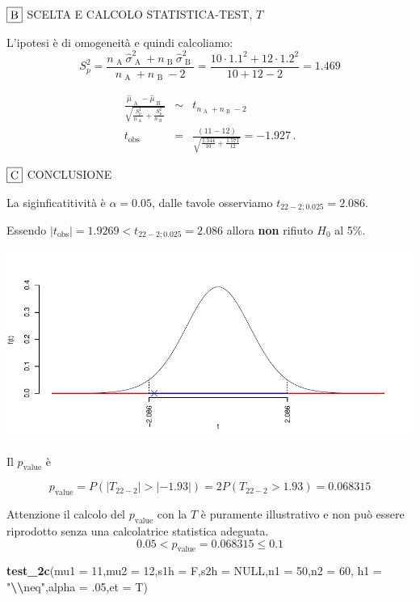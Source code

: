 \documentclass[
  11pt,
]{book}
\newenvironment{Shaded}{\begin{snugshade}}{\end{snugshade}}
\newcommand{\AttributeTok}[1]{\textcolor[rgb]{0.13,0.29,0.53}{#1}}
\newcommand{\ConstantTok}[1]{\textcolor[rgb]{0.56,0.35,0.01}{#1}}
\newcommand{\DecValTok}[1]{\textcolor[rgb]{0.00,0.00,0.81}{#1}}
\newcommand{\FunctionTok}[1]{\textcolor[rgb]{0.13,0.29,0.53}{\textbf{#1}}}
\newcommand{\NormalTok}[1]{#1}
\newcommand{\SpecialCharTok}[1]{\textcolor[rgb]{0.81,0.36,0.00}{\textbf{#1}}}
\newcommand{\StringTok}[1]{\textcolor[rgb]{0.31,0.60,0.02}{#1}}
\theoremstyle{mytheoremstyle}
\theoremstyle{mydefstyle}
\begin{document}
\(\fbox{B}\) SCELTA E CALCOLO STATISTICA-TEST, \(T\)

L'ipotesi è di omogeneità e quindi calcoliamo:\[
   S_p^2=\frac{n_\text{ A }\hat\sigma^2_\text{ A }+n_\text{ B }\hat\sigma^2_\text{ B }}{n_\text{ A }+n_\text{ B }-2} =
   \frac{ 10 \cdot 1.1 ^2+ 12 \cdot 1.2 ^2}{ 10 + 12 -2}= 1.469 
  \]

\begin{eqnarray*}
  \frac{\hat\mu_\text{ A } - \hat\mu_\text{ B }}
  {\sqrt{\frac {S^2_p}{n_\text{ A }}+\frac {S^2_p}{n_\text{ B }}}}&\sim&t_{n_\text{ A }+n_\text{ B }-2}\\
  t_{\text{obs}}
  &=& \frac{ ( 11 -  12 )} {\sqrt{\frac{ 1.344 }{ 10 }+\frac{ 1.571 }{ 12 }}}
  =   -1.927 \, .
  \end{eqnarray*}

\(\fbox{C}\) CONCLUSIONE

La siginficatitività è \(\alpha=0.05\), dalle tavole osserviamo \(t_{22-2;0.025}=2.086\).

Essendo \(|t_\text{obs}|=1.9269<t_{22-2;0.025}=2.086\) allora \textbf{non} rifiuto \(H_0\) al 5\%.

\begin{center}\includegraphics{Appunti_di_Statistica_2025_files/figure-latex/25-test-functions-10-9} \end{center}

Il \(p_{\text{value}}\) è

\[ p_{\text{value}} = P(|T_{22-2}|>|-1.93|)=2P(T_{22-2}>1.93)=0.068315 \]

Attenzione il calcolo del \(p_\text{value}\) con la \(T\) è puramente illustrativo e non può essere riprodotto senza una calcolatrice statistica adeguata.\[
 0.05 < p_\text{value}= 0.068315 \leq 0.1 
\]

\begin{Shaded}
\begin{Highlighting}[]
\FunctionTok{test\_2c}\NormalTok{(}\AttributeTok{mu1 =} \DecValTok{11}\NormalTok{,}\AttributeTok{mu2 =} \DecValTok{12}\NormalTok{,}\AttributeTok{s1h =}\NormalTok{ F,}\AttributeTok{s2h =} \ConstantTok{NULL}\NormalTok{,}\AttributeTok{n1 =} \DecValTok{50}\NormalTok{,}\AttributeTok{n2 =} \DecValTok{60}\NormalTok{,}
            \AttributeTok{h1 =} \StringTok{"}\SpecialCharTok{\textbackslash{}\textbackslash{}}\StringTok{neq"}\NormalTok{,}\AttributeTok{alpha =}\NormalTok{ .}\DecValTok{05}\NormalTok{,}\AttributeTok{et =}\NormalTok{ T)}
\end{Highlighting}
\end{Shaded}
\end{document}
